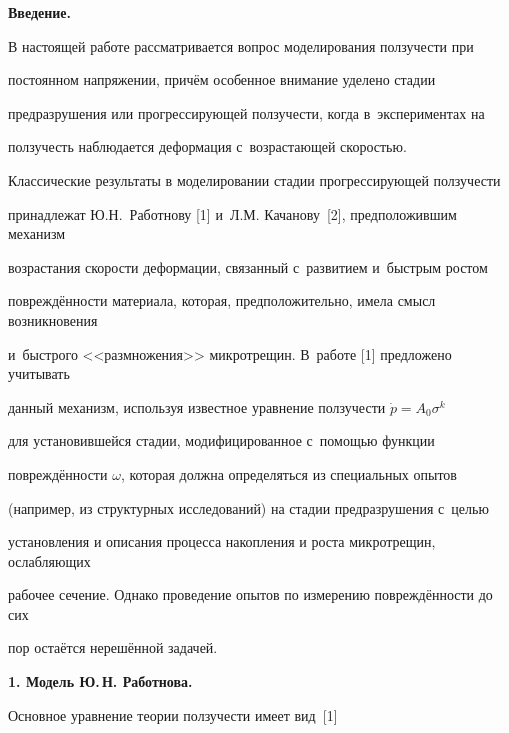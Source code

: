 \maketitle







\small





\textbf{Введение.}

В настоящей работе рассматривается вопрос моделирования ползучести при

постоянном напряжении, причём особенное внимание уделено стадии

пред\-разрушения или прогрессирующей ползучести, когда в~экспериментах на

ползучесть наблюдается деформация с~возрастающей скоростью.



Классические результаты в моделировании стадии прогрессирующей ползучести

принадлежат Ю.Н.~Работнову [1] и~Л.М. Качанову~[2], предположившим механизм

возрастания скорости деформации, связанный с~развитием и~быстрым ростом

повреждённости материала, которая, предположительно, имела смысл возникновения

и~быстрого <<размножения>> микротрещин. В~работе [1] предложено учитывать

данный механизм, используя известное уравнение ползучести $\dot {p}=A_0 \sigma ^k$

для установившейся стадии, модифицированное с~помощью функции

повреждённости $\omega $, которая должна определяться из специальных опытов

(например, из структурных исследований) на стадии предразрушения с~целью

установления и описания процесса накопления и роста микротрещин, ослабляющих

рабочее сечение. Однако проведение опытов по измерению повреждённости до сих

пор остаётся нерешённой задачей.







\textbf{1. Модель Ю.\,Н. Работнова.}

Основное уравнение теории ползучести  имеет вид~[1]

